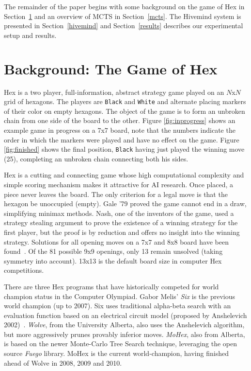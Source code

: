 \documentclass{acm_proc_article-sp}
\newcommand{\hblack}{\texttt{Black}}
\newcommand{\hwhite}{\texttt{White}}
\begin{document}
The remainder of the paper begins with some background on the game of Hex in Section~\ref{s:hex} and
an overview of MCTS in Section~\ref{mcts}.
The Hivemind system is presented in Section~\ref{hivemind}
and Section~\ref{results} describes our experimental setup and results.




\section{Background: The Game of Hex}
\label{s:hex}
Hex is a two player, full-information, abstract strategy game played on an $N$x$N$ grid of hexagons. The players are \hblack{} and \hwhite{} and alternate placing markers of their color on empty hexagons. 
The object of the game is to form an unbroken chain from one side of the board to the other. 
Figure \ref{fig:inprogress} shows an example game in progress on a 7x7 board, note that the numbers indicate
the order in which the markers were played and have no effect on the game.
Figure \ref{fig:finished} shows the final position, \hblack{} having just played the winning move (25), completing an unbroken chain connecting both his sides. 

Hex is a cutting and connecting game whose high computational complexity and simple scoring mechanism makes it attractive for AI research. 
Once placed, a piece never leaves the board. 
The only criterion for a legal move is that the hexagon be unoccupied (empty). 
Gale '79 proved the game cannot end in a draw, simplifying minimax methods. 
Nash, one of the inventors of the game, used a strategy stealing argument to prove the existence of a winning strategy for the first player, but the proof is by reduction and offers no insight into the winning strategy.
Solutions for all opening moves on a 7x7 and 8x8 board have been found~\cite{henderson2009solving}. 
Of the 81 possible 9x9 openings, only 13 remain unsolved (taking symmetry into account). 13x13 is the default board size in computer Hex competitions.

There are three Hex programs that have historically competed for world champion status in the Computer Olympiad. Gabor Melis' \emph{Six} is the previous world champion (up to 2007). 
Six uses traditional alpha-beta search with an evaluation function based on an electrical circuit model (proposed by Anshelevich 2002)~\cite{anshelevich2002hierarchical}. 
\emph{Wolve}, from the University Alberta, also uses the Anshelevich algorithm, but more aggressively prunes provably inferior moves. 
\emph{MoHex}, also from Alberta, is based on the newer Monte-Carlo Tree Search technique, leveraging the open source \emph{Fuego} library. 
MoHex is the current world-champion, having finished ahead of Wolve in 2008, 2009 and 2010.
\end{document}
